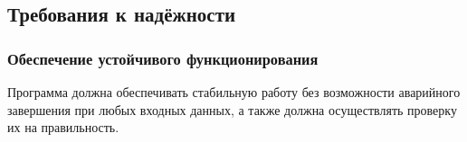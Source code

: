 \subsection{Требования к надёжности}

\subsubsection{Обеспечение устойчивого функционирования}

Программа должна обеспечивать стабильную работу без возможности аварийного завершения при любых входных данных, а также должна осуществлять проверку их на правильность.